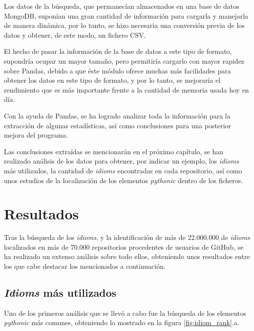 \documentclass[a4paper, 12pt]{book}
\begin{document}
Los datos de la búsqueda, que permanecían almacenados en una base de datos MongoDB, suponían una gran cantidad de información para cargarla y manejarla de manera dinámica, por lo tanto, se hizo necesaria una conversión previa de los datos y obtener, de este modo, un fichero CSV.

El hecho de pasar la información de la base de datos a este tipo de formato, supondría ocupar un mayor tamaño, pero permitiría cargarlo con mayor rapidez sobre Pandas, debido a que éste módulo ofrece muchas más facilidades para obtener los datos en este tipo de formato, y por lo tanto, se mejoraría el rendimiento que es más importante frente a la cantidad de memoria usada hoy en día.

Con la ayuda de Pandas, se ha logrado analizar toda la información para la extracción de algunas estadísticas, así como conclusiones para una posterior mejora del programa.

Las conclusiones extraídas se mencionarán en el próximo capítulo, se han realizado análisis de los datos para obtener, por indicar un ejemplo, los \textit{idioms} más utilizados, la cantidad de \textit{idioms} encontradas en cada repositorio, así como unos estudios de la localización de los elementos \textit{pythonic} dentro de los ficheros.


\cleardoublepage
\chapter{Resultados}
\label{chap:results}

Tras la búsqueda de los \textit{idioms}, y la identificación de más de 22.000.000 de \textit{idioms} localizados en más de 70.000 repositorios procedentes de usuarios de GitHub, se ha realizado un extenso análisis sobre todo ellos, obteniendo unos resultados entre los que cabe destacar los mencionados a continuación.




\section{\textit{Idioms} más utilizados}
\label{sec:idioms_ranking}
Uno de los primeros análisis que se llevó a cabo fue la búsqueda de los elementos \textit{pythonic} más comunes, obteniendo lo mostrado en la figura \ref{fig:idiom_rank}.a.
\end{document}
